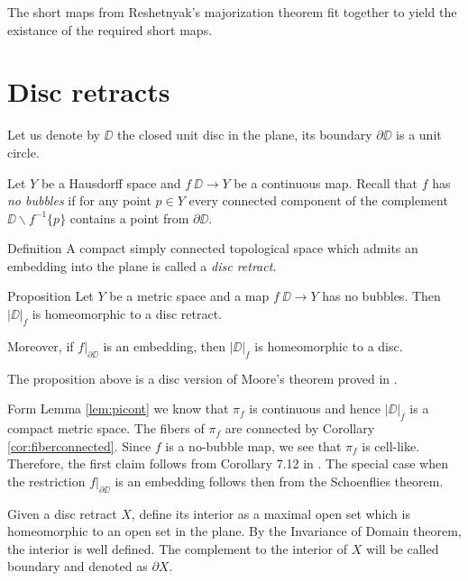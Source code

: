 \documentclass{article}
\begin{document}
The short maps from Reshetnyak's majorization theorem fit together to yield the existance of the required short maps.
\qeds







\section{Disc retracts}\label{Metric minimizing discs}



Let us denote by $\DD$ the closed unit disc in the plane,
its boundary $\partial \DD$ is a unit circle.

Let $Y$ be a Hausdorff space and
$f\:\DD\to Y$ be a continuous map.
Recall that $f$ has \emph{no bubbles}
if for any point $p\in Y$ every connected component of the complement $\DD\backslash f^{-1}\{p\}$ contains a point from $\partial \DD$.

\begin{thm}{Definition}
A compact simply connected topological space which admits an embedding into the plane is 
called a \emph{disc retract}. 
\end{thm}


\begin{thm}{Proposition}\label{prop:disc-moore}
Let $Y$ be a metric space and a map $f\:\DD\to Y$ has no bubbles.
Then $|\DD|_f$ is homeomorphic to a disc retract.

Moreover, if $f|_{\partial\DD}$ is an embedding, then $|\DD|_f$ is homeomorphic to a disc.
\end{thm}

The proposition above is a disc version of Moore's theorem \cite{moore} proved in \cite{LW3}.

Form Lemma \ref{lem:picont} we know that $\pi_f$ is continuous and hence $|\DD|_f$
is a compact metric space. 
The fibers of $\pi_f$ are connected by Corollary \ref{cor:fiberconnected}.
Since $f$ is a no-bubble map, we see that $\pi_f$ is cell-like. 
Therefore, the first claim follows from 
Corollary 7.12 in \cite{LW3}.
The special case when the restriction $f|_{\partial\DD}$ is an embedding follows then from the Schoenflies theorem.
\qeds

Given a disc retract $X$,
define its interior as a maximal open set which is homeomorphic to an open set in the plane.
By the Invariance of Domain theorem, the interior is well defined.
The complement to the interior of $X$ will be called boundary and denoted as $\partial X$.
\end{document}
